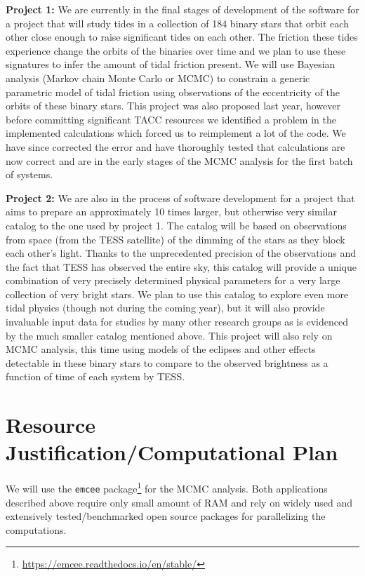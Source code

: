 \documentclass[12pt]{article}
\begin{document}
\textbf{Project 1:} We are currently in the final stages of development of the
software for a project that will study tides in a collection of 184 binary stars
that orbit each other close enough to raise significant tides on each other. The
friction these tides experience change the orbits of the binaries over time and
we plan to use these signatures to infer the amount of tidal friction present.
We will use Bayesian analysis (Markov chain Monte Carlo or MCMC) to constrain a
generic parametric model of tidal friction using observations of the
eccentricity of the orbits of these binary stars. This project was also proposed
last year, however before committing significant TACC resources we identified a
problem in the implemented calculations which forced us to reimplement a lot of
the code. We have since corrected the error and have thoroughly tested that
calculations are now correct and are in the early stages of the MCMC analysis
for the first batch of systems.

\textbf{Project 2:} We are also in the process of software development for a
project that aims to prepare an approximately 10 times larger, but otherwise
very similar catalog to the one used by project 1. The catalog will be based on
observations from space (from the TESS satellite) of the dimming of the stars as
they block each other's light. Thanks to the unprecedented precision of the
observations and the fact that TESS has observed the entire sky, this catalog
will provide a unique combination of very precisely determined physical
parameters for a very large collection of very bright stars.  We plan to use
this catalog to explore even more tidal physics (though not during the coming
year), but it will also provide invaluable input data for studies by many other
research groups as is evidenced by the much smaller catalog mentioned above.
This project will also rely on MCMC analysis, this time using models of the
eclipses and other effects detectable in these binary stars to compare to the
observed brightness as a function of time of each system by TESS.

\section{Resource Justification/Computational Plan}

We will use the \texttt{emcee}
package\footnote{\url{https://emcee.readthedocs.io/en/stable/}} for the MCMC
analysis. Both applications described above require only small amount of RAM and
rely on widely used and extensively tested/benchmarked open source packages
for parallelizing the computations.
\end{document}
